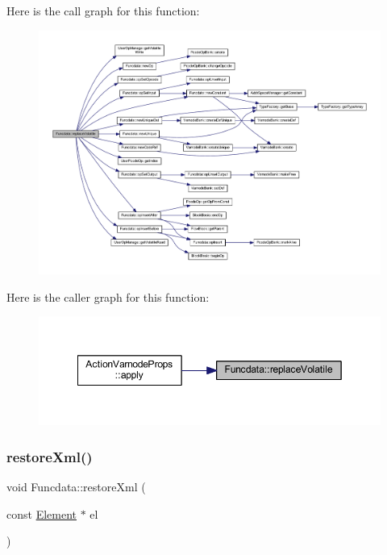 Here is the call graph for this function\+:
\nopagebreak
\begin{figure}[H]
\begin{center}
\leavevmode
\includegraphics[width=350pt]{class_funcdata_a754fe8bd5805e6d9fd8041365e7747eb_cgraph}
\end{center}
\end{figure}
Here is the caller graph for this function\+:
\nopagebreak
\begin{figure}[H]
\begin{center}
\leavevmode
\includegraphics[width=349pt]{class_funcdata_a754fe8bd5805e6d9fd8041365e7747eb_icgraph}
\end{center}
\end{figure}
\mbox{\label{class_funcdata_a40da83020eebf723001109c64407cef4}} 
\subsubsection{\texorpdfstring{restoreXml()}{restoreXml()}}
{\footnotesize\ttfamily void Funcdata\+::restore\+Xml (\begin{DoxyParamCaption}\item[{const \mbox{\hyperlink{class_element}{Element}} $\ast$}]{el }\end{DoxyParamCaption})}



